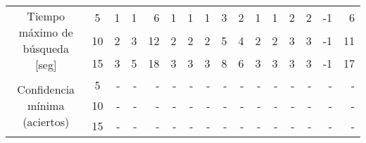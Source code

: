 \begin{sidewaystable}
\begin{tabular}{@{}ccc|rrrrrrrrrrrrrr@{}}
\midrule
\multicolumn{2}{c}{\multirow{3}{*}{Tiempo máximo de búsqueda {[}seg{]}}}     & 5                    & 1                      & 1                      & 6                      & 1                      & 1                      & 1                      & 3                      & 2                      & 1                      & 1                      & 2                      & 2                      & -1                     & 6                      \\
\multicolumn{2}{c}{}                                               & 10                   & 2                      & 3                      & 12                     & 2                      & 2                      & 2                      & 5                      & 4                      & 2                      & 2                      & 3                      & 3                      & -1                     & 11                     \\
\multicolumn{2}{c}{}                                               & 15                   & 3                      & 5                      & 18                     & 3                      & 3                      & 3                      & 8                      & 6                      & 3                      & 3                      & 3                      & 3                      & -1                     & 17                     \\
\midrule
\multicolumn{2}{c}{\multirow{3}{*}{Confidencia mínima (aciertos)}} & 5                    & -                      & -                      & -                      & -                      & -                      & -                      & -                      & -                      & -                      & -                      & -                      & -                      & -                      & -                      \\
\multicolumn{2}{c}{}                                               & 10                   & -                      & -                      & -                      & -                      & -                      & -                      & -                      & -                      & -                      & -                      & -                      & -                      & -                      & -                      \\
\multicolumn{2}{c}{}                                               & 15                   & -                      & -                      & -                      & -                      & -                      & -                      & -                      & -                      & -                      & -                      & -                      & -                      & -                      & -                      \\

\end{tabular}
\end{sidewaystable}
